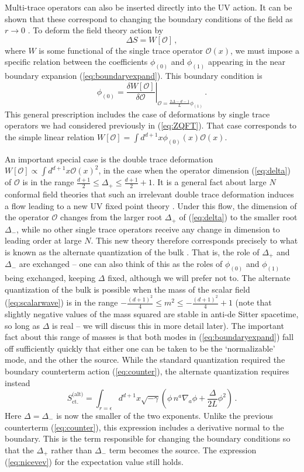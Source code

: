 \documentclass[10pt, oneside]{book}
\def\be{\begin{equation}}
\def\ee{\end{equation}}
\def\ocal{{\mathcal{O}}}
\begin{document}
\begin{doublespace}
Multi-trace operators can also be inserted directly into the UV action. It can be shown that these correspond to changing the boundary conditions of the field as $r \to 0$ \cite{Witten:2001ua, Marolf:2006nd}. To deform the field theory action by
\be
\Delta S = W[\ocal] \,,
\ee
where $W$ is some functional of the single trace operator $\ocal(x)$, we must impose a specific relation between the coefficients $\phi_{(0)}$ and $\phi_{(1)}$ appearing in the near boundary expansion (\ref{eq:boundaryexpand}). This boundary condition is
\be\label{eq:genboundary}
\phi_{(0)} = \left. \frac{\delta W[\ocal]}{\delta \ocal}\right|_{\ocal = \frac{2 \Delta - d-1}{L} \phi_{(1)}} \,.
\ee
This general prescription includes the case of deformations by single trace operators we had considered previously in (\ref{eq:ZQFT}). That case corresponds to the simple linear relation $W[\ocal] = \int d^{d+1}x \phi_{(0)}(x) \ocal(x)$.

An important special case is the double trace deformation $W[\ocal] \propto \int d^{d+1}x \ocal(x)^2$, in the case when the operator dimension (\ref{eq:delta}) of $\ocal$ is in the range $\frac{d+1}{2} \leq \Delta_+ \leq \frac{d+1}{2} + 1$. It is a general fact about large $N$ conformal field theories that such an irrelevant double trace deformation induces a flow leading to a new UV fixed point theory \cite{Gubser:2002vv}. Under this flow, the dimension of the operator $\ocal$ changes from the larger root $\Delta_+$ of (\ref{eq:delta}) to the smaller root $\Delta_-$, while no other single trace operators receive any change in dimension to leading order at large $N$. This new theory therefore corresponds precisely to what is known as the alternate quantization of the bulk 
\cite{Klebanov:1999tb}. That is, the role of $\Delta_+$ and $\Delta_-$ are exchanged -- one can also think of this as the roles of $\phi_{(0)}$ and $\phi_{(1)}$ being exchanged, keeping $\Delta$ fixed, although we will prefer not to. The alternate quantization of the bulk is possible when the mass of the scalar field (\ref{eq:scalarwave}) is in the range $-\frac{(d+1)^2}{4} \leq m^2 \leq -\frac{(d+1)^2}{4} + 1$ (note that slightly negative values of the mass squared are stable in anti-de Sitter spacetime, so long as $\Delta$ is real -- we will discuss this in more detail later). The important fact about this range of masses is that both modes in (\ref{eq:boundaryexpand}) fall off sufficiently quickly that either one can be taken to be the `normalizable' mode, and the other the source. While the standard quantization required the boundary counterterm action (\ref{eq:counter}), the alternate quantization requires instead
\be
S_\text{ct.}^\text{(alt)} = \int_{r=\epsilon} d^{d+1}x \sqrt{-\gamma} \left(\phi \, n^a \nabla_a \phi + \frac{\Delta}{2 L} \phi^2 \right) \,.
\ee
Here $\Delta = \Delta_-$ is now the smaller of the two exponents. Unlike the previous counterterm (\ref{eq:counter}), this expression includes a derivative normal to the boundary. This is the term responsible for changing the boundary conditions so that the $\Delta_+$ rather than $\Delta_-$ term becomes the source. The expression (\ref{eq:nicevev}) for the expectation value still holds.


\end{doublespace}
\end{document}
